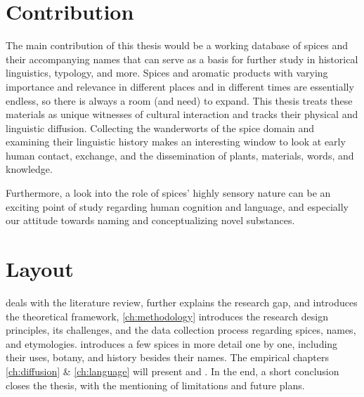 
\section{Contribution}

The main contribution of this thesis would be a working database of spices and their accompanying names that can serve as a basis for further study in historical linguistics, typology, and more. Spices and aromatic products with varying importance and relevance in different places and in different times are essentially endless, so there is always a room (and need) to expand. This thesis treats these materials as unique witnesses of cultural interaction and tracks their physical and linguistic diffusion. Collecting the \glspl{wanderwort} of the spice domain and examining their linguistic history makes an interesting window to look at early human contact, exchange, and the dissemination of plants, materials, words, and knowledge.

Furthermore, a look into the role of spices' highly sensory nature can be an exciting point of study regarding human cognition and language, and especially our attitude towards naming and conceptualizing novel substances.





\section{Layout}

  deals with the literature review, further explains the research gap, and introduces the theoretical framework, \cref{ch:methodology}  introduces the research design principles, its challenges, and the data collection process regarding spices, names, and etymologies.   introduces a few spices in more detail one by one, including their uses, botany, and history besides their names. The empirical chapters \cref{ch:diffusion} \& \cref{ch:language} will present  and . In the end, a short conclusion closes the thesis, with the mentioning of limitations and future plans.











